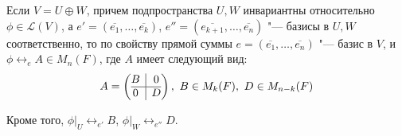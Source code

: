 \begin{note}
	Если $V = U \oplus W$, причем подпространства $U, W$ инвариантны относительно $\phi \in \mathcal{L}(V)$, а $e' = (\overline{e_1}, \dots, \overline{e_k})$, $e'' = (\overline{e_{k + 1}}, \dots, \overline{e_n})$ "--- базисы в $U, W$ соответственно, то по свойству прямой суммы $e = (\overline{e_1}, \dots, \overline{e_n})$ "--- базис в $V$, и $\phi \leftrightarrow_e A \in M_n(F)$, где $A$ имеет следующий вид:
	\[A = \left(\begin{array}{@{}c|c@{}}
	B & 0\\
	\hline
	0 & D
	\end{array}\right),~B \in M_k(F),~D \in M_{n - k}(F)\]
	
	Кроме того, $\phi|_U \leftrightarrow_{e'} B$, $\phi|_W \leftrightarrow_{e''} D$.
\end{note}